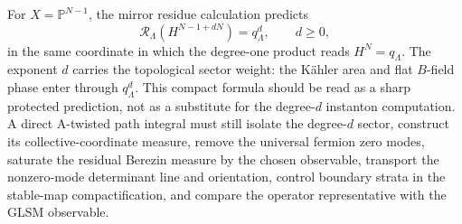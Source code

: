 \begin{remark}
\label{rem:cpn-degree-d-vortex-observable-iteration}
For \(X=\mathbb P^{N-1}\), the mirror residue calculation predicts
\[
  \mathcal R_\Lambda(H^{N-1+dN})=q_\Lambda^d,\qquad d\ge0,
\]
in the same coordinate in which the degree-one product reads
\(H^N=q_\Lambda\).  The exponent \(d\) carries the topological sector
weight: the K\"ahler area and flat \(B\)-field phase enter through
\(q_\Lambda^d\).  This compact formula should be read as a sharp protected
prediction, not as a substitute for the degree-\(d\) instanton computation.
A direct A-twisted path integral must still isolate the degree-\(d\) sector,
construct its collective-coordinate measure, remove the universal fermion
zero modes, saturate the residual Berezin measure by the chosen observable,
transport the nonzero-mode determinant line and orientation, control boundary
strata in the stable-map compactification, and compare the operator
representative with the GLSM observable.


\end{remark}
